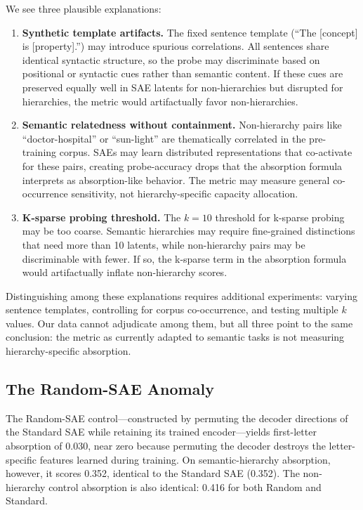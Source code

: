 \documentclass{article}
\begin{document}
We see three plausible explanations:

\begin{enumerate}
\item \textbf{Synthetic template artifacts.} The fixed sentence template (``The [concept] is [property].'') may introduce spurious correlations. All sentences share identical syntactic structure, so the probe may discriminate based on positional or syntactic cues rather than semantic content. If these cues are preserved equally well in SAE latents for non-hierarchies but disrupted for hierarchies, the metric would artifactually favor non-hierarchies.

\item \textbf{Semantic relatedness without containment.} Non-hierarchy pairs like ``doctor-hospital'' or ``sun-light'' are thematically correlated in the pre-training corpus. SAEs may learn distributed representations that co-activate for these pairs, creating probe-accuracy drops that the absorption formula interprets as absorption-like behavior. The metric may measure general co-occurrence sensitivity, not hierarchy-specific capacity allocation.

\item \textbf{K-sparse probing threshold.} The $k = 10$ threshold for k-sparse probing may be too coarse. Semantic hierarchies may require fine-grained distinctions that need more than 10 latents, while non-hierarchy pairs may be discriminable with fewer. If so, the k-sparse term in the absorption formula would artifactually inflate non-hierarchy scores.
\end{enumerate}

Distinguishing among these explanations requires additional experiments: varying sentence templates, controlling for corpus co-occurrence, and testing multiple $k$ values. Our data cannot adjudicate among them, but all three point to the same conclusion: the metric as currently adapted to semantic tasks is not measuring hierarchy-specific absorption.

\subsection{The Random-SAE Anomaly}

The Random-SAE control---constructed by permuting the decoder directions of the Standard SAE while retaining its trained encoder---yields first-letter absorption of 0.030, near zero because permuting the decoder destroys the letter-specific features learned during training. On semantic-hierarchy absorption, however, it scores 0.352, identical to the Standard SAE (0.352). The non-hierarchy control absorption is also identical: 0.416 for both Random and Standard.
\end{document}
